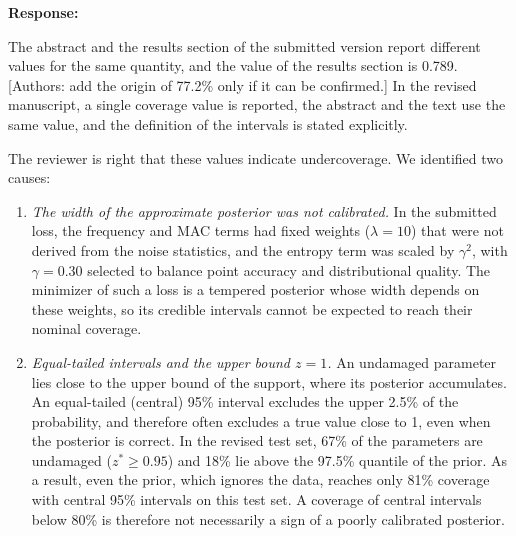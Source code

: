 \documentclass[11pt]{article}
\newenvironment{response}{\par\smallskip\noindent\color{resp}\textbf{Response:}\ }{\par}
\newcommand{\authornote}[1]{\textcolor{note}{\textsf{[Authors: #1]}}}
\begin{document}
\begin{response}

The abstract and the results section of the submitted version report different values for the same quantity, and the value of the results section is 0.789.
\authornote{add the origin of 77.2\% only if it can be confirmed.} In the revised manuscript, a single coverage value is
reported, the abstract and the text use the same value, and the definition of the intervals is stated explicitly.

The reviewer is right that these values indicate undercoverage. We identified two causes:
\begin{enumerate}[leftmargin=*]
\item \emph{The width of the approximate posterior was not calibrated.} In the submitted loss, the frequency and MAC
terms had fixed weights ($\lambda=10$) that were not derived from the noise statistics, and the entropy term was
scaled by $\gamma^2$, with $\gamma=0.30$ selected to balance point accuracy and distributional quality. The minimizer of such a loss is a tempered posterior
whose width depends on these weights, so its credible intervals cannot be expected to reach their nominal coverage.
\item \emph{Equal-tailed intervals and the upper bound $z=1$.} An undamaged parameter lies close to the upper bound of
the support, where its posterior accumulates. An equal-tailed (central) 95\% interval excludes the upper 2.5\% of the
probability, and therefore often excludes a true value close to 1, even when the posterior is correct. In the revised
test set, 67\% of the parameters are undamaged ($z^*\ge0.95$) and 18\% lie above the 97.5\% quantile of the prior. As a
result, even the prior, which ignores the data, reaches only 81\% coverage with central 95\% intervals on this test set.
A coverage of central intervals below 80\% is therefore not necessarily a sign of a poorly calibrated posterior.
\end{enumerate}


\end{response}
\end{document}
